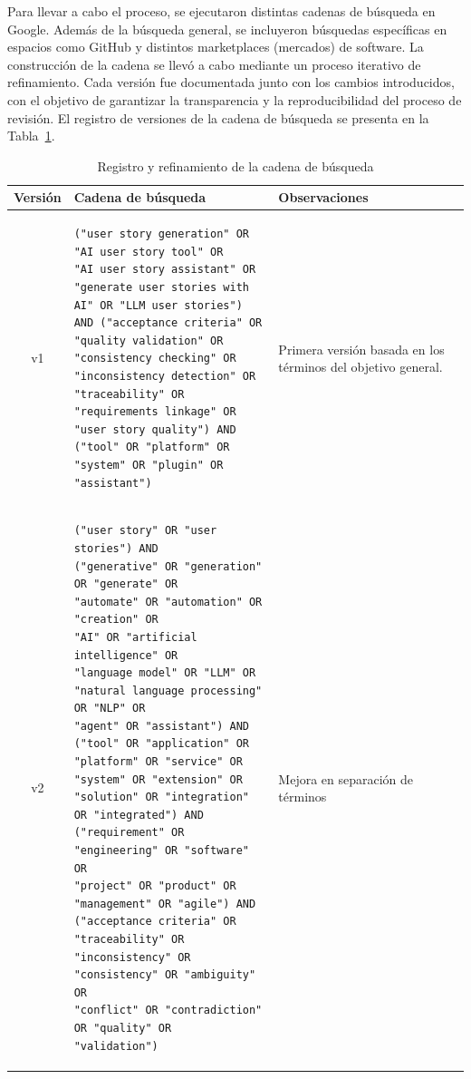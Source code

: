 Para llevar a cabo el proceso, se ejecutaron distintas cadenas de búsqueda en Google. Además de la búsqueda general, se incluyeron búsquedas específicas en espacios como GitHub y distintos marketplaces (mercados) de software.
La construcción de la cadena se llevó a cabo mediante un proceso iterativo de refinamiento. Cada versión fue documentada junto con los cambios introducidos, con el objetivo de garantizar la transparencia y la reproducibilidad del proceso de revisión.
El registro de versiones de la cadena de búsqueda se presenta en la Tabla~\ref{table:cadenas-busqueda}.

\newpage
\begin{longtable}{|c|p{10cm}|p{2.5cm}|}
\caption{Registro y refinamiento de la cadena de búsqueda}
\label{table:cadenas-busqueda} \\
\hline
\textbf{Versión} & \textbf{Cadena de búsqueda} & \textbf{Observaciones} \\
\hline
v1 & 
\begin{verbatim} 
("user story generation" OR "AI user story tool" OR
"AI user story assistant" OR
"generate user stories with AI" OR "LLM user stories")
AND ("acceptance criteria" OR "quality validation" OR
"consistency checking" OR "inconsistency detection" OR
"traceability" OR "requirements linkage" OR
"user story quality") AND ("tool" OR "platform" OR
"system" OR "plugin" OR "assistant")

\end{verbatim}
& Primera versión basada en los términos del objetivo general. \\
\hline
v2 & 
\begin{verbatim} 
("user story" OR "user stories") AND
("generative" OR "generation" OR "generate" OR
"automate" OR "automation" OR "creation" OR 
"AI" OR "artificial intelligence" OR 
"language model" OR "LLM" OR
"natural language processing" OR "NLP" OR
"agent" OR "assistant") AND ("tool" OR "application" OR
"platform" OR "service" OR "system" OR "extension" OR
"solution" OR "integration" OR "integrated") AND
("requirement" OR "engineering" OR "software" OR
"project" OR "product" OR "management" OR "agile") AND
("acceptance criteria" OR "traceability" OR
"inconsistency" OR "consistency" OR "ambiguity" OR
"conflict" OR "contradiction" OR "quality" OR
"validation")

\end{verbatim}
& Mejora en separación de términos \\
\hline
\end{longtable}

